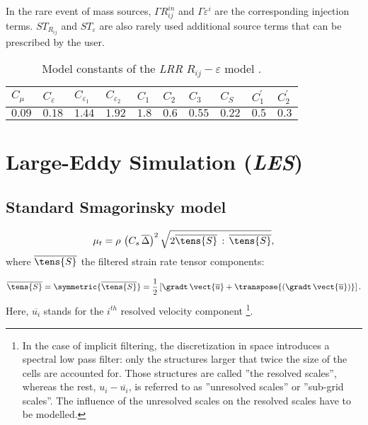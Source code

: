 In the rare event of mass sources, $\Gamma R_{ij}^{in}$ and $\Gamma
\varepsilon ^{i}$ are the corresponding injection terms. $ST_{R_{ij}}$ and $%
ST_{\varepsilon }$ are also rarely used additional source terms that can be
prescribed by the user.

\begin{table}[!htp]
\begin{center}
\begin{tabular}{p{}|p{}|p{}|p{}|p{}|p{}|p{}|p{}|p{}|p{}}
$C_\mu$ & $C_{\varepsilon}$ & $C_{\varepsilon_1}$ & $C_{\varepsilon_2}$ & $%
C_1$ & $C_2$ & $C_3$ & $C_S$ & $C^{\prime}_1$ & $C^{\prime}_2$ \\ \hline
$0.09$ & $0.18$ & $1.44$ & $1.92$ & $1.8$ & $0.6$ & $0.55$ & $0.22$ & $0.5$
& $0.3$
\end{tabular}
\end{center}
\caption{Model constants of the \emph{LRR} $R_{ij}-\varepsilon$ model \cite{Launder:1975}.}
\end{table}

\section{Large-Eddy Simulation (\emph{LES})}

\subsection{Standard Smagorinsky model}

\hypertarget{smago}{}

\begin{equation}
\mu_{t}=\rho \, \left( C_{s}\,\overline{\Delta } \right)^{2}
\sqrt{2\overline{\tens{S}} \,: \, \overline{\tens{S}}},
\end{equation}%
%
where $\overline{\tens{S}}$ the filtered strain rate tensor components:

\begin{equation}
\overline{\tens{S}}= \symmetric{\overline{\tens{S}}} =
\frac{1}{2} \left[ \gradt \, \vect{\overline{u}} + \transpose{\left( \gradt \, \vect{\overline{u}} \right)}
\right].
\end{equation}
%
%
Here, $\overline{u_{i}}$ stands for the $i^{th}$ resolved velocity component
\footnote{%
In the case of implicit filtering, the discretization in space introduces a
spectral low pass filter: only the structures larger that twice the size of
the cells are accounted for. Those structures are called ''the resolved
scales'', whereas the rest, $u_{i}-\overline{u_{i}}$, is referred to as
''unresolved scales'' or ''sub-grid scales''. The influence of the
unresolved scales on the resolved scales have to be modelled.}.

